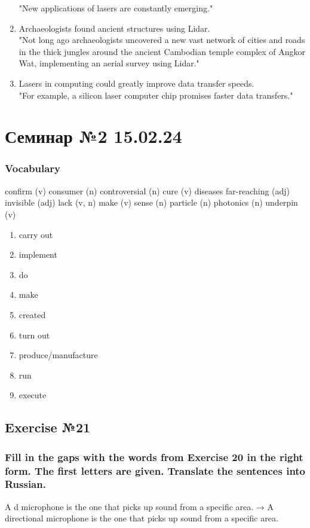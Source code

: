 \begin{enumerate}
            "New applications of lasers are constantly emerging." 
      \item Archaeologists found ancient structures using Lidar. \\
            "Not long ago archaeologists uncovered a new vast network of cities and
            roads in the thick jungles around the ancient Cambodian temple complex
            of Angkor Wat, implementing an aerial survey using Lidar."
      \item Lasers in computing could greatly improve data transfer speeds. \\
            "For example, a silicon laser computer chip promises faster data
            transfers." 
\end{enumerate}

\chapter{Семинар №2 15.02.24}

\subsection*{Vocabulary}

confirm (v)
consumer (n)
controversial (n)
cure (v) diseases
far-reaching (adj)
invisible (adj)
lack (v, n)
make (v) sense (n)
particle (n)
photonics (n)
underpin (v)

\begin{enumerate}
      \item carry out
      \item implement
      \item do
      \item make
      \item created
      \item turn out
      \item produce/manufacture
      \item run
      \item execute
\end{enumerate}

\section{Exercise №21}
\subsection*{Fill in the gaps with the words from Exercise 20 in the right form. The
      first letters are given. Translate the sentences into Russian.}
A d\underline{\hspace{2cm}} microphone is the one that picks up sound from a specific area.
→ A directional microphone is the one that picks up sound from a specific area.

